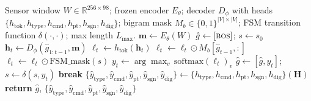 \documentclass[sensors,article,submit,moreauthors,pdftex]{Definitions/mdpi}
\newcommand{\modelname}{G-Code Decoder}
\begin{document}
\begin{algorithm}[!htbp]
\let\item\olditem %
\renewcommand{\baselinestretch}{1.1}\selectfont
\caption{Grammar-masked autoregressive forward pass for \modelname{}.}
\label{alg:forward}
\begin{algorithmic}[1]
\setlength{\itemsep}{2pt}
\Require Sensor window $W \in \mathbb{R}^{256 \times 98}$; frozen encoder $E_\theta$; decoder $D_\phi$ with heads $\{h_{\text{tok}}, h_{\text{type}}, h_{\text{cmd}}, h_{\text{pt}}, h_{\text{sgn}}, h_{\text{dig}}\}$; bigram mask $M_b \in \{0,1\}^{|V|\times|V|}$; FSM transition function $\delta(\cdot,\cdot)$; max length $L_{\max}$.
\Statex
\State $\mathbf{m} \gets E_\theta(W)$ 
\State $\hat{g} \gets [\textsc{bos}]$; $s \gets s_0$ 
  \State $\mathbf{h}_t \gets D_\phi(\hat{g}_{1:t-1}, \mathbf{m})$ 
  \State $\boldsymbol{\ell}_t \gets h_{\text{tok}}(\mathbf{h}_t)$ 
  \State $\boldsymbol{\ell}_t \gets \boldsymbol{\ell}_t \odot M_b[\hat{g}_{t-1}, :]$ 
  \State $\boldsymbol{\ell}_t \gets \boldsymbol{\ell}_t \odot \mathrm{FSM\_mask}(s)$ 
  \State $y_t \gets \arg\max_v \, \mathrm{softmax}(\boldsymbol{\ell}_t)_v$
  \State $\hat{g} \gets [\hat{g}, y_t]$; $s \gets \delta(s, y_t)$
   \textbf{break} \EndIf
\EndFor
\State $\{\hat{y}_{\text{type}}, \hat{y}_{\text{cmd}}, \hat{y}_{\text{pt}}, \hat{y}_{\text{sgn}}, \hat{y}_{\text{dig}}\} \gets \{h_{\text{type}}, h_{\text{cmd}}, h_{\text{pt}}, h_{\text{sgn}}, h_{\text{dig}}\}(\mathbf{H})$ 
\State \textbf{return} $\hat{g}$, $\{\hat{y}_{\text{type}}, \hat{y}_{\text{cmd}}, \hat{y}_{\text{pt}}, \hat{y}_{\text{sgn}}, \hat{y}_{\text{dig}}\}$
\end{algorithmic}
\end{algorithm}
\end{document}
